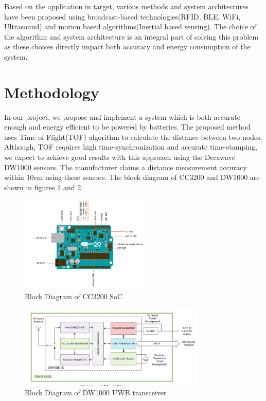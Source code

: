 \documentclass[journal,transmag]{IEEEtran}
\begin{document}
Based on the application in target, various methods and system architectures have been proposed using broadcast-based technologies(RFID\cite{bouet2008rfid}, BLE\cite{alps}, WiFi\cite{yang2012locating}, Ultrasound\cite{ultrasonic}) and motion based algorithms(Inertial based sensing)\cite{li2012reliable}. The choice of the algorithm and system architecture is an integral part of solving this problem as these choices directly impact both accuracy and energy consumption of the system. 

\section{Methodology}
In our project, we propose and implement a system which is both accurate enough and energy efficient to be powered by batteries. The proposed method uses Time of Flight(TOF) algorithm to calculate the distance between two nodes. Although, TOF requires high time-synchronization and accurate time-stamping, we expect to achieve good results with this approach using the Decawave DW1000 sensors. The manufacturer claims a distance measurement accuracy within 10cm using these sensors.  The block diagram of CC3200 and DW1000 are shown in figures \ref{CC3200BD} and \ref{DW1000BD}.

\begin{figure}[!h]
\centering
\includegraphics[width=2.5in]{arduinounobd}
\caption{{Block Diagram of CC3200 SoC}}
\label{CC3200BD}
\end{figure}


\begin{figure}[!t]
\centering
\includegraphics[width=3.5in]{dw1000bd}
\caption{{Block Diagram of DW1000 UWB transceiver}}
\label{DW1000BD}
\end{figure}
\end{document}
